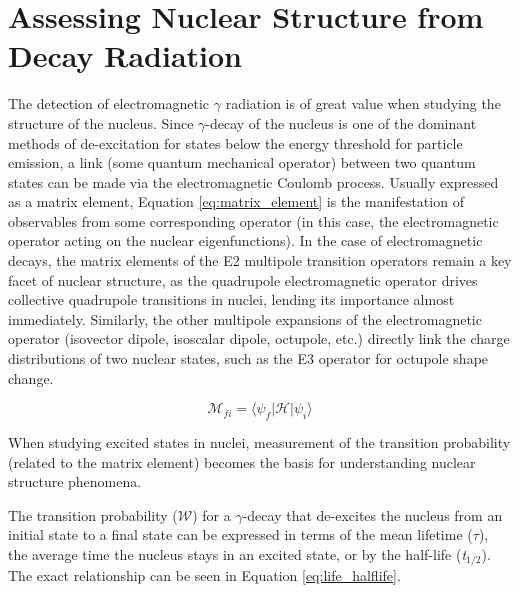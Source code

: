 \section{Assessing Nuclear Structure from Decay Radiation}
The detection of electromagnetic $\gamma$ radiation is of great value when studying the structure of the nucleus. Since $\gamma$-decay of the nucleus is one of the dominant methods of de-excitation for states below the energy threshold for particle emission, a link (some quantum mechanical operator) between two quantum states can be made via the electromagnetic Coulomb process. Usually expressed as a matrix element, Equation \ref{eq:matrix_element} is the manifestation of observables from some corresponding operator (in this case, the electromagnetic operator acting on the nuclear eigenfunctions). In the case of electromagnetic decays, the matrix elements of the E2 multipole transition operators remain a key facet of nuclear structure, as the quadrupole electromagnetic operator drives collective quadrupole transitions in nuclei, lending its importance almost immediately. Similarly, the other multipole expansions of the electromagnetic operator (isovector dipole, isoscalar dipole, octupole, etc.) directly link the charge distributions of two nuclear states, such as the E3 operator for octupole shape change.

\begin{equation}\label{eq:matrix_element}
\mathcal{M}_{fi}=\langle\psi_f\vert\mathcal{H}\vert\psi_i\rangle
\end{equation}

When studying excited states in nuclei, measurement of the transition probability (related to the matrix element) becomes the basis for understanding nuclear structure phenomena. 

\label{sec:why_lifetimes}
The transition probability ($\mathcal{W}$) for a $\gamma$-decay that de-excites the nucleus from an initial state to a final state can be expressed in terms of the mean lifetime ($\tau$), the average time the nucleus stays in an excited state, or by the half-life (\textit{t$_{1/2}$}). The exact relationship can be seen in Equation \ref{eq:life_halflife}.

